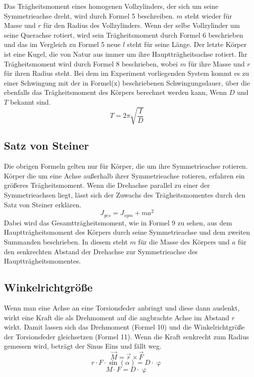 \documentclass[titlepage = firstcover]{scrartcl}
\begin{document}
      Das Trägheitsmoment eines homogenen  Vollzylinders, der sich um seine Symmetrieachse dreht, wird durch Formel 5 beschreiben. $m$ steht wieder für 
      Masse und $r$ für den Radius des Vollzylinders. Wenn der selbe Vollzylinder um seine Querachse rotiert, wird sein Trägheitsmoment durch Formel 6 beschrieben 
      und das im Vergleich zu Formel 5 neue $l$ steht für seine Länge. Der letzte Körper ist eine Kugel, die von Natur aus immer um ihre Hauptträgheitsachse 
      rotiert. Ihr Trägheitsmoment wird durch Formel 8 beschrieben, wobei $m$ für ihre Masse und $r$ für ihren Radius steht. Bei dem im Experiment vorliegenden System
      kommt es zu einer Schwingung mit der in Formel(x) beschriebenen Schwingungsdauer, über die ebenfalls das Trägheitsmoment des Körpers berechnet werden kann, Wenn
      $D$ und $T$ bekannt sind.
      \begin{equation}
        T = 2\pi \sqrt{\frac{I}{D}}
      \end{equation}

      \subsection{Satz von Steiner}
      Die obrigen Formeln gelten nur für Körper, die um ihre Symmetrieachse rotieren. Körper die um eine Achse außerhalb ihrer Symmetrieachse rotieren, erfahren
      ein größeres Trägheitsmoment. Wenn die Drehachse parallel zu einer der Symmetrieachsen liegt, lässt sich der Zuwachs des Trägheitsmomentes durch den Satz 
      von Steiner erklären. 
      \begin{equation}
        J_{ges} = J_{sym} + ma^2
      \end{equation}
      Dabei wird das Gesamtträgheitsmoment, wie in Formel 9 zu sehen, aus dem Hauptträgheitsmoment des Körpers durch seine Symmetrieachse und dem zweiten 
      Summanden beschrieben. In diesem steht $m$ für die Masse des Körpers und $a$ für den senkrechten Abstand der Drehachse zur Symmetrieachse des
      Hauptträgheitsmomentes.

      \subsection{Winkelrichtgröße}
      Wenn man eine Achse an eine Torsionsfeder anbringt und diese dann auslenkt, wirkt eine Kraft die als Drehmoment auf die angbrachte Achse im Abstand $r$
      wirkt. Damit lassen sich das Drehmoment (Formel 10) und die Winkelrichtgröße der Torsionsfeder gleichsetzen (Formel 11). Wenn die Kraft senkrecht zum Radius gemessen wird,
      beträgt der Sinus Eins und fällt weg.
      \begin{equation}
        \vec{M} = \vec{r} \times \vec{F}
      \end{equation}
      \begin{equation}
        r \cdot F \cdot \sin(\alpha) = D \cdot \upvarphi
      \end{equation}
      \begin{equation*}
        M \cdot F = D \cdot \upvarphi
      \end{equation*} 
\end{document}
